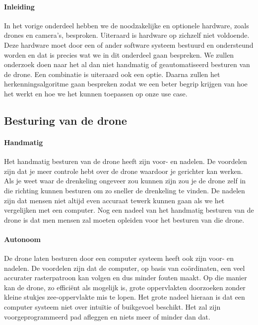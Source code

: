 \paragraph{Inleiding}
In het vorige onderdeel hebben we de noodzakelijke en optionele hardware, zoals drones en camera's, besproken. Uiteraard is hardware op zichzelf niet voldoende. Deze hardware moet door een of ander software systeem bestuurd en ondersteund worden en dat is precies wat we in dit onderdeel gaan bespreken. We zullen onderzoek doen naar het al dan niet handmatig of geautomatiseerd besturen van de drone. Een combinatie is uiteraard ook een optie. Daarna zullen het herkenningsalgoritme gaan bespreken zodat we een beter begrip krijgen van hoe het werkt en hoe we het kunnen toepassen op onze use case.

\subsection{Besturing van de drone}

\paragraph{Handmatig}

Het handmatig besturen van de drone heeft zijn voor- en nadelen. De voordelen zijn dat je meer controle hebt over de drone waardoor je gerichter kan werken. Als je weet waar de drenkeling ongeveer zou kunnen zijn zou je de drone zelf in die richting kunnen besturen om zo sneller de drenkeling te vinden. De nadelen zijn dat mensen niet altijd even accuraat tewerk kunnen gaan als we het vergelijken met een computer. Nog een nadeel van het handmatig besturen van de drone is dat men mensen zal moeten opleiden voor het besturen van die drone.

\paragraph{Autonoom}

De drone laten besturen door een computer systeem heeft ook zijn voor- en nadelen. De voordelen zijn dat de computer, op basis van coördinaten, een veel accurater rasterpatroon kan volgen en dus minder fouten maakt. Op die manier kan de drone, zo efficiënt als mogelijk is, grote oppervlakten doorzoeken zonder kleine stukjes zee-oppervlakte mis te lopen. Het grote nadeel hieraan is dat een computer systeem niet over intuïtie of buikgevoel beschikt. Het zal zijn voorgeprogrammeerd pad afleggen en niets meer of minder dan dat.  

